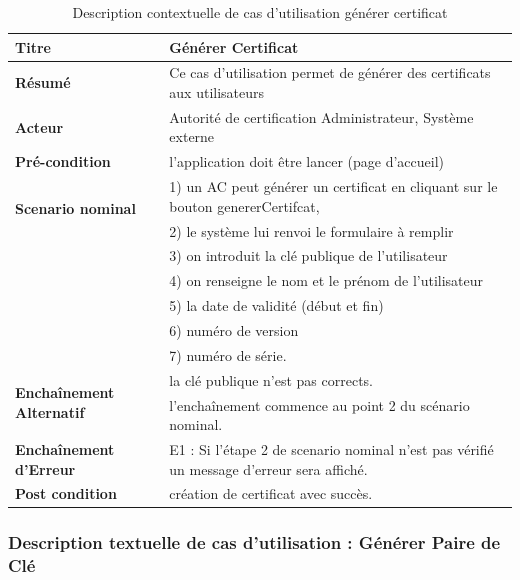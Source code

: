 \documentclass[12pt,a4paper]{article}
\begin{document}
			\begin{table}[H]
			
				\centering
					\caption{Description contextuelle de cas d'utilisation générer certificat}
				\begin{tabular}{|l|p{11cm}|}
					\hline 
						\textbf{Titre} & Générer Certificat \\ 
					\hline 
						\textbf{Résumé} & Ce cas d'utilisation permet de générer des certificats aux utilisateurs \\ 
					\hline 
						\textbf{Acteur} & Autorité de certification Administrateur, Système externe \\  
				
					\hline 
						\textbf{Pré-condition} & l'application doit être lancer (page d'accueil) \\ 
					\hline 
						\multirow{2}{*}{\textbf{Scenario nominal}} & 1) un AC peut générer un certificat en cliquant sur le bouton genererCertifcat, \\
							 & 2) le système lui renvoi le formulaire à remplir \\
							 & 3) on introduit la clé publique de l'utilisateur \\
							 & 4) on renseigne le nom et le prénom de l'utilisateur \\
							 & 5) la date de validité (début et fin)\\
							 & 6) numéro de version\\
							 &7) numéro de série. \\
					\hline 
					
						\multirow{2}{*}{\textbf{Enchaînement Alternatif}} & la clé publique n'est pas corrects. \\
							  & l'enchaînement commence au point 2 du scénario nominal. \\
							
					\hline 
						\textbf{Enchaînement d'Erreur} & E1 : Si l'étape 2 de scenario nominal n'est pas vérifié un message d'erreur sera affiché. \\
					\hline
						\textbf{Post condition} & création de certificat avec succès.\\
					\hline
				
			\end{tabular} 
			
		\end{table}
	
		
	\subsubsection{Description textuelle de cas d'utilisation : Générer Paire de Clé}
	
\end{document}
